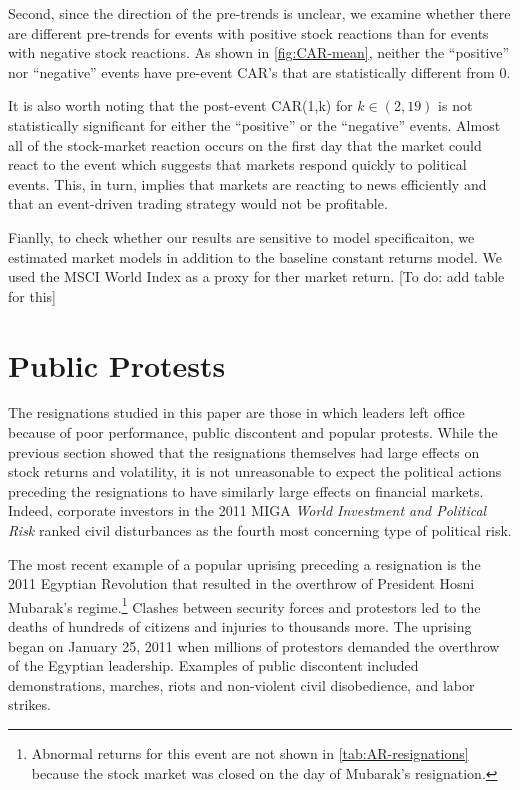 \documentclass[12pt,final,fleqn]{article}
\theoremstyle{plain}
\begin{document}
Second, since the direction of the pre-trends is unclear, we examine whether there are different pre-trends for events with positive stock reactions than for events with negative stock reactions. As shown in \autoref{fig:CAR-mean}, neither the ``positive'' nor ``negative'' events have pre-event CAR's that are statistically different from 0.

It is also worth noting that the post-event CAR(1,k) for $k\in(2,19)$ is not statistically significant for either the ``positive'' or the ``negative'' events. Almost all of the stock-market reaction occurs on the first day that the market could react to the event which suggests that markets respond quickly to political events. This, in turn, implies that markets are reacting to news efficiently and that an event-driven trading strategy would not be profitable.

Fianlly, to check whether our results are sensitive to model specificaiton, we estimated market models in addition to the baseline constant returns model. We used the MSCI World Index as a proxy for ther market return. [To do: add table for this]  

\section{Public Protests} \label{sec: Public Protests}
The resignations studied in this paper are those in which leaders left office because of poor performance, public discontent and popular protests. While the previous section showed that the resignations themselves had large effects on stock returns and volatility, it is not unreasonable to expect the political actions preceding the resignations to have similarly large effects on financial markets. Indeed, corporate investors in the 2011 MIGA \textit{World Investment and Political Risk} ranked civil disturbances as the fourth most concerning type of political risk.

The most recent example of a popular uprising preceding a resignation is the 2011 Egyptian Revolution that resulted in the overthrow of President Hosni Mubarak's regime.\footnote{Abnormal returns for this event are not shown in \autoref{tab:AR-resignations} because the stock market was closed on the day of Mubarak's resignation.} Clashes between security forces and protestors led to the deaths of hundreds of citizens and injuries to thousands more. The uprising began on January 25, 2011 when millions of protestors demanded the overthrow of the Egyptian leadership. Examples of public discontent included demonstrations, marches, riots and non-violent civil disobedience, and labor strikes.
\end{document}

